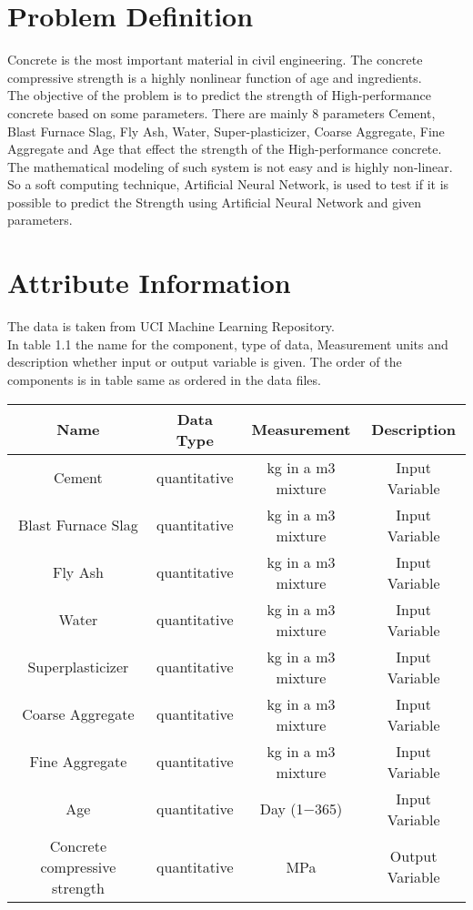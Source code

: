\section{Problem Definition}
Concrete is the most important material in civil engineering. The concrete compressive strength is a highly nonlinear function of age and ingredients.\\
The objective of the problem is to predict the strength of High-performance concrete based on some parameters.
There are mainly 8 parameters Cement, Blast Furnace Slag, Fly Ash, Water, Super-plasticizer, Coarse Aggregate, Fine Aggregate and Age that effect the strength of the High-performance concrete. The mathematical modeling of such system is not easy and is highly non-linear. So a soft computing technique, Artificial Neural Network, is used to test if it is possible to predict the Strength using Artificial Neural Network and given parameters.

\section{Attribute Information}
The data is taken from UCI Machine Learning Repository.\\
In table 1.1 the name for the component, type of data, Measurement units and description whether input or output variable is given. The order of the components is in table same as ordered in the data files.\\
\begin{center}
\begin{tabular}{|c|c|c|c|}
\hline
Name & Data Type & Measurement & Description\\
\hline
Cement & quantitative & kg in a m3 mixture & Input Variable\\
\hline
Blast Furnace Slag & quantitative & kg in a m3 mixture & Input Variable\\
\hline
Fly Ash & quantitative & kg in a m3 mixture & Input Variable\\
\hline
Water & quantitative & kg in a m3 mixture & Input Variable\\
\hline
Superplasticizer & quantitative & kg in a m3 mixture & Input Variable\\
\hline
Coarse Aggregate & quantitative & kg in a m3 mixture & Input Variable\\
\hline
Fine Aggregate & quantitative & kg in a m3 mixture & Input Variable\\
\hline
Age & quantitative & Day (1$-$365) & Input Variable\\
\hline
Concrete compressive strength & quantitative & MPa & Output Variable\\
\hline
\end{tabular}
\end{center}
